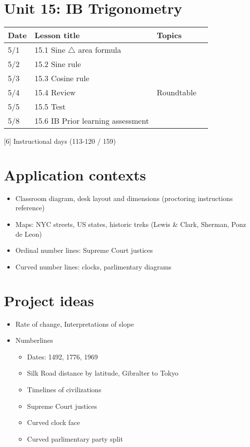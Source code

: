 \documentclass[12pt, twoside]{article}
\begin{document}
\section*{Unit 15: IB Trigonometry}
\begin{tabular}{|p{0.9cm}|p{4cm}|p{7cm}|p{5cm}|}
  \hline
  Date & Lesson title & Topics  &  \\
  \hline
  5/1 & 15.1 Sine $\triangle$ area formula &  &  \\
  \hline
  5/2 & 15.2 Sine rule &  &  \\
  \hline
  5/3 & 15.3 Cosine rule &  &  \\
  \hline
  5/4 & 15.4 Review & Roundtable &  \\
  \hline
  5/5 & 15.5 Test &  &  \\
  \hline
  5/8 & 15.6 IB Prior learning assessment &  &  \\
  \hline

\end{tabular} \par \vspace*{0.3cm}
[6] Instructional days (113-120 / 159)


\newpage
\section*{Application contexts}
\begin{itemize}
  \item Classroom diagram, desk layout and dimensions (proctoring instructions reference)
  \item Maps: NYC streets, US states, historic treks (Lewis \& Clark, Sherman, Ponz de Leon)
  \item Ordinal number lines: Supreme Court justices
  \item Curved number lines: clocks, parlimentary diagrams
\end{itemize}

\section*{Project ideas}
\begin{itemize}
  \item Rate of change, Interpretations of slope
  \item Numberlines
  \begin{itemize}
    \item Dates: 1492, 1776, 1969
    \item Silk Road distance by latitude, Gibralter to Tokyo
    \item Timelines of civilizations
    \item Supreme Court justices
    \item Curved clock face 
    \item Curved parlimentary party split
  \end{itemize}
\end{itemize}
\end{document}
